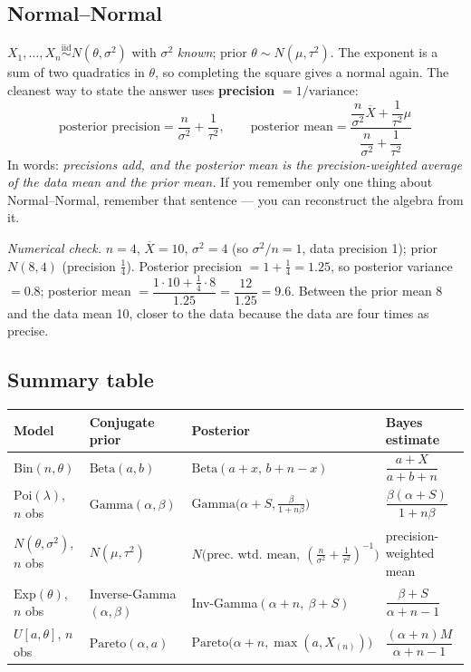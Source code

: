 \documentclass[11pt]{article}
\newcommand{\Xbar}{\overline{X}}
\newcommand{\iid}{\overset{\text{iid}}{\sim}}
\begin{document}
\subsection{Normal--Normal}
$X_1,\dots,X_n\iid N(\theta,\sigma^2)$ with $\sigma^2$ \emph{known}; prior $\theta\sim N(\mu,\tau^2)$.
The exponent is a sum of two quadratics in $\theta$, so completing the square gives a normal
again. The cleanest way to state the answer uses \textbf{precision} $=1/\text{variance}$:
\[
\boxed{\
\text{posterior precision}=\frac{n}{\sigma^{2}}+\frac{1}{\tau^{2}},\qquad
\text{posterior mean}=
\frac{\dfrac{n}{\sigma^{2}}\Xbar+\dfrac{1}{\tau^{2}}\mu}
     {\dfrac{n}{\sigma^{2}}+\dfrac{1}{\tau^{2}}}\ }
\]
In words: \emph{precisions add, and the posterior mean is the precision-weighted average of
the data mean and the prior mean.} If you remember only one thing about Normal--Normal,
remember that sentence --- you can reconstruct the algebra from it.

\emph{Numerical check.} $n=4$, $\Xbar=10$, $\sigma^2=4$ (so $\sigma^2/n=1$, data precision 1);
prior $N(8,4)$ (precision $\tfrac14$). Posterior precision $=1+\tfrac14=1.25$, so posterior
variance $=0.8$; posterior mean $=\dfrac{1\cdot10+\tfrac14\cdot8}{1.25}=\dfrac{12}{1.25}=9.6$.
Between the prior mean 8 and the data mean 10, closer to the data because the data are four
times as precise. \checkmark

\subsection{Summary table}
\begin{center}
\renewcommand{\arraystretch}{1.5}
\begin{tabular}{@{}llll@{}}
\toprule
Model & Conjugate prior & Posterior & Bayes estimate \\
\midrule
$\mathrm{Bin}(n,\theta)$ & $\mathrm{Beta}(a,b)$ & $\mathrm{Beta}(a+x,\,b+n-x)$ & $\dfrac{a+X}{a+b+n}$ \\
$\mathrm{Poi}(\lambda)$, $n$ obs & $\mathrm{Gamma}(\alpha,\beta)$ & $\mathrm{Gamma}\big(\alpha+S,\tfrac{\beta}{1+n\beta}\big)$ & $\dfrac{\beta(\alpha+S)}{1+n\beta}$ \\
$N(\theta,\sigma^2)$, $n$ obs & $N(\mu,\tau^2)$ & $N\big(\text{prec.\ wtd.\ mean},\ (\tfrac{n}{\sigma^2}+\tfrac1{\tau^2})^{-1}\big)$ & precision-weighted mean \\
$\mathrm{Exp}(\theta)$, $n$ obs & Inverse-Gamma$(\alpha,\beta)$ & Inv-Gamma$(\alpha+n,\ \beta+S)$ & $\dfrac{\beta+S}{\alpha+n-1}$ \\
$U[a,\theta]$, $n$ obs & $\mathrm{Pareto}(\alpha,a)$ & $\mathrm{Pareto}\big(\alpha+n,\max(a,X_{(n)})\big)$ & $\dfrac{(\alpha+n)M}{\alpha+n-1}$ \\
\bottomrule
\end{tabular}
\end{center}
\end{document}
